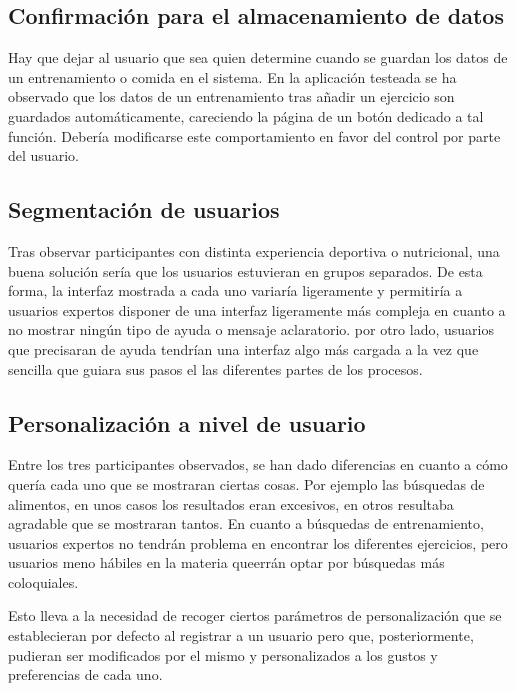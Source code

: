 \documentclass[a4paper]{article}
\begin{document}
	\subsection{Confirmación para el almacenamiento de datos}
	
	Hay que dejar al usuario que sea quien determine cuando se guardan los datos de un entrenamiento o comida en el sistema. En la aplicación testeada se ha observado que los datos de un entrenamiento tras añadir un ejercicio son guardados automáticamente, careciendo la página de un botón dedicado a tal función. Debería modificarse este comportamiento en favor del control por parte del usuario.
	
	\subsection{Segmentación de usuarios}
	
	Tras observar participantes con distinta experiencia deportiva o nutricional, una buena solución sería que los usuarios estuvieran en grupos separados. De esta forma, la interfaz mostrada a cada uno variaría ligeramente y permitiría a usuarios expertos disponer de una interfaz ligeramente más compleja en cuanto a no mostrar ningún tipo de ayuda o mensaje aclaratorio. por otro lado, usuarios que precisaran de ayuda tendrían una interfaz algo más cargada a la vez que sencilla que guiara sus pasos el las diferentes partes de los procesos.
	
	\subsection{Personalización a nivel de usuario}
	
	Entre los tres participantes observados, se han dado diferencias en cuanto a cómo quería cada uno que se mostraran ciertas cosas. Por ejemplo las búsquedas de alimentos, en unos casos los resultados eran excesivos, en otros resultaba agradable que se mostraran tantos. En cuanto a búsquedas de entrenamiento, usuarios expertos no tendrán problema en encontrar los diferentes ejercicios, pero usuarios meno hábiles en la materia queerrán optar por búsquedas más coloquiales.
	
	Esto lleva a la necesidad de recoger ciertos parámetros de personalización que se establecieran por defecto al registrar a un usuario pero que, posteriormente, pudieran ser modificados por el mismo y personalizados a los gustos y preferencias de cada uno.
	
\end{document}
